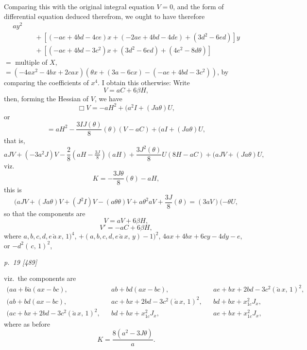 \documentclass[11pt,a4paper]{book}
\begin{document}
Comparing this with the original integral equation $V = 0$, and the form of differential
equation deduced therefrom, we ought to have therefore
\begin{align*}
[(4b^2 - 8ad)x^2 + (-2ae + 4bd)x &+ (-ae + 4bd - 3c^2)]ay^2\\
&\quad + [(-ae + 4bd - 4ce)x + (-2ae + 4bd - 4de) + (3d^2 - 6ed)] y\\
&\quad + [(-ae + 4bd - 3c^2)x + (3d^2 - 6ed) + (4e^2 - 8d\theta)]
\end{align*}
$=$ multiple of $X$,
\\
$=(-4ax^2 - 4bx + 2cax)(\theta x + (3a-6cx) - (-ae + 4bd - 3c^2))$,
by comparing the coefficients of $x^4$.
I obtain this otherwise:
Write
\[
V = aC + 6\beta H,
\]
then, forming the Hessian of $V$, we have
\[
\Box V = -aH^2 + (a^2I + (Ja\theta) U,
\]
or
\[
= aH^2 - \frac{3IJ(\theta)}{8}(\theta) (V - aC) + (aI + (Ja\theta) U,
\]
that is,
\[
aJV + (-3a^2J)V - \frac{2}{8}(aH - \tfrac{3J}{8})(aH) + \frac{3J^2(\theta)}{8} U(8H - aC) + (aJV + (Ja\theta) U,
\]
viz.
\[
K = -\frac{3J\theta}{8}(\theta) - aH,
\]
this is
\[
(aJV + (Ja\theta)V + (J^2I)V - (a\theta\theta)V + a\theta^2 a V + \frac{3J}{8}(\theta) = (3aV)(- \theta U,
\]
so that the components are
\[
V = aV + 6\beta H,
\]
\[
V' = -aC + 6\beta H,
\]
where $a, b, c, d, e\,\check{a}\,x,\,1)^4$,
$+(a, b, c, d, e\,\check{a}\,x,\,y) - 1)^2$, $4ax + 4bx + 6cy - 4dy - e$, or $-d^2(\,c,\,1)^2$,

\clearpage

\bigskip
\textit{p.~19 [489]}
\smallskip

viz.\ the components are
\begin{align*}
(aa+b\check{a}(ax-bc), && ab+bd(ax-bc), && ae+bx+2bd-3c^2(\check{a}\,x,\,1)^2,\\
(ab+bd(ax-bc), && ac+bx+2bd-3c^2(\check{a}\,x,\,1)^2, && bd+bx+x_{1c}^2J_x,\\
(ac+bx+2bd-3c^2(\check{a}\,x,\,1)^2, && bd+bx+x_{1c}^2J_x, && ae+bx+x_{1c}^2J_x,
\end{align*}
where as before
\[
K = \frac{8(a^2 - 3J\theta)}{a}.
\]
\end{document}
